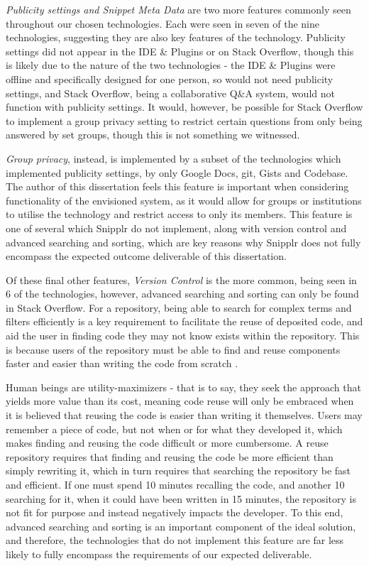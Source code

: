 \textit{Publicity settings and Snippet Meta Data} are two more features commonly seen throughout our chosen technologies.
Each were seen in seven of the nine technologies, suggesting they are also key features of the technology.
Publicity settings did not appear in the IDE \& Plugins or on Stack Overflow, though this is likely due to the nature of the two technologies - the IDE \& Plugins were offline and specifically designed for one person, so would not need publicity settings, and Stack Overflow, being a collaborative Q\&A system, would not function with publicity settings.
It would, however, be possible for Stack Overflow to implement a group privacy setting to restrict certain questions from only being answered by set groups, though this is not something we witnessed.

\textit{Group privacy}, instead, is implemented by a subset of the technologies which implemented publicity settings, by only Google Docs, git, Gists and Codebase.
The author of this dissertation feels this feature is important when considering functionality of the envisioned system, as it would allow for groups or institutions to utilise the technology and restrict access to only its members.
This feature is one of several which Snipplr do not implement, along with version control and advanced searching and sorting, which are key reasons why Snipplr does not fully encompass the expected outcome deliverable of this dissertation.

Of these final other features, \textit{Version Control} is the more common, being seen in 6 of the technologies, however, advanced searching and sorting can only be found in Stack Overflow.
For a repository, being able to search for complex terms and filters efficiently is a key requirement to facilitate the reuse of deposited code, and aid the user in finding code they may not know exists within the repository.
This is because users of the repository must be able to find and reuse components faster and easier than writing the code from scratch \cite{Krueger1992}.

Human beings are utility-maximizers \cite{Cognition1997} - that is to say, they seek the approach that yields more value than its cost, meaning code reuse will only be embraced when it is believed that reusing the code is easier than writing it themselves.
Users may remember a piece of code, but not when or for what they developed it, which makes finding and reusing the code difficult or more cumbersome.
A reuse repository requires that finding and reusing the code be more efficient than simply rewriting it, which in turn requires that searching the repository be fast and efficient.
If one must spend 10 minutes recalling the code, and another 10 searching for it, when it could have been written in 15 minutes, the repository is not fit for purpose and instead negatively impacts the developer.
To this end, advanced searching and sorting is an important component of the ideal solution, and therefore, the technologies that do not implement this feature are far less likely to fully encompass the requirements of our expected deliverable.

